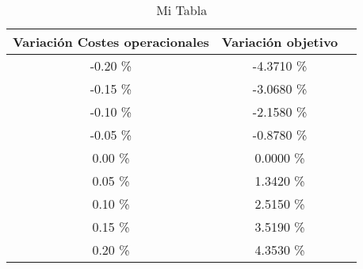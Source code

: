 \begin{table}
\centering
\begin{tabular}{|c|c|c|}
\hline
 Variación Costes operacionales & Variación objetivo \\ \hline
-0.20 \% & -4.3710 \% \\ \hline
-0.15 \% & -3.0680 \% \\ \hline
-0.10 \% & -2.1580 \% \\ \hline
-0.05 \% & -0.8780 \% \\ \hline
0.00 \% & 0.0000 \% \\ \hline
0.05 \% & 1.3420 \% \\ \hline
0.10 \% & 2.5150 \% \\ \hline
0.15 \% & 3.5190 \% \\ \hline
0.20 \% & 4.3530 \% \\ \hline
\end{tabular}
\caption{Mi Tabla}
\end{table}
